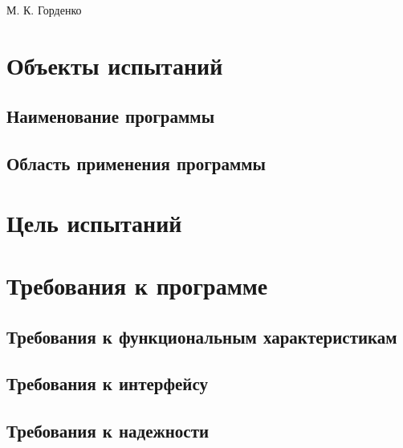 \documentclass[a4paper,12pt]{article}
\begin{document}

    {М. К. Горденко}

    \firstPage
    \newpage
    \secondPage
    \newpage
    \thirdPage
    \newpage


    \section{Объекты испытаний}

    \subsection{Наименование программы}

    \subsection{Область применения программы}

    \newpage


    \section{Цель испытаний}

    \newpage


    \section{Требования к программе}

    \subsection{Требования к функциональным характеристикам}

    \subsection{Требования к интерфейсу}

    \subsection{Требования к надежности}

    \newpage
\end{document}
